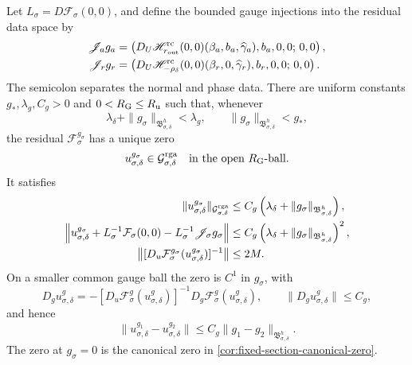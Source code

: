 \begin{theorem}
Let \(L_\sigma=D\mathcal F_\sigma(0,0)\), and define the bounded gauge
injections into the residual data space by
\begin{align}
 \mathscr J_a g_a
 &=\left(
  D_U\mathscr H_{r_{\rm out}}^{\rm rc}(0,0)
       (\beta_a,b_a,\widehat\gamma_a),
       b_a,0,0;\,0,0\right),\notag\\
 \mathscr J_r g_r
 &=\left(
  D_U\mathscr H_{-\rho_\delta}^{\rm rc}(0,0)
       (\beta_r,0,\widehat\gamma_r),
       b_r,0,0;\,0,0\right).                     \label{eq:raw-gauge-linear-injections}
\end{align}
The semicolon separates the normal and phase data.  There are uniform
constants \(g_*,\lambda_g,C_g>0\) and
\(0<R_{\rm G}\le R_{\rm u}\) such that, whenever
\begin{equation}
 \lambda_\delta+\|g_\sigma\|_{\mathfrak B_{\sigma,\delta}^h}
 <\lambda_g,
 \qquad
 \|g_\sigma\|_{\mathfrak B_{\sigma,\delta}^h}<g_*,          \label{eq:raw-gauge-smallness}
\end{equation}
the residual \(\mathcal F_\sigma^{g_\sigma}\) has a unique zero
\begin{equation}
 u_{\sigma,\delta}^{g_\sigma}
 \in\mathcal G_{\sigma,\delta}^{\rm rga}
 \quad\hbox{in the open \(R_{\rm G}\)-ball}.     \label{eq:raw-gauge-zero}
\end{equation}
It satisfies
\begin{align}
 \|u_{\sigma,\delta}^{g_\sigma}\|_
       {\mathcal G_{\sigma,\delta}^{\rm rga}}
 &\le C_g\left(\lambda_\delta
       +\|g_\sigma\|_{\mathfrak B_{\sigma,\delta}^h}\right),
                                                        \label{eq:raw-gauge-zero-size}\\
 \left\|u_{\sigma,\delta}^{g_\sigma}
     +L_\sigma^{-1}\mathcal F_\sigma(0,0)
     -L_\sigma^{-1}\mathscr J_\sigma g_\sigma\right\|
 &\le C_g\left(\lambda_\delta
       +\|g_\sigma\|_{\mathfrak B_{\sigma,\delta}^h}\right)^2,
                                                        \label{eq:raw-gauge-first-jet}\\
 \bigl\|[D_u\mathcal F_\sigma^{g_\sigma}
       (u_{\sigma,\delta}^{g_\sigma})]^{-1}\bigr\|
 &\le2M.                                           \label{eq:raw-gauge-zero-inverse}
\end{align}
On a smaller common gauge ball the zero is \(C^1\) in \(g_\sigma\), with
\begin{equation}
 D_g u_{\sigma,\delta}^{g}
 =-[D_u\mathcal F_\sigma^g(u_{\sigma,\delta}^g)]^{-1}
       D_g\mathcal F_\sigma^g(u_{\sigma,\delta}^g),
 \qquad
 \|D_g u_{\sigma,\delta}^g\|\le C_g,           \label{eq:raw-gauge-zero-derivative}
\end{equation}
and hence
\begin{equation}
 \|u_{\sigma,\delta}^{g_1}-u_{\sigma,\delta}^{g_2}\|
 \le C_g\|g_1-g_2\|_{\mathfrak B_{\sigma,\delta}^h}.       \label{eq:raw-gauge-zero-lipschitz}
\end{equation}
The zero at \(g_\sigma=0\) is the canonical zero in
\cref{cor:fixed-section-canonical-zero}.


\end{theorem}
